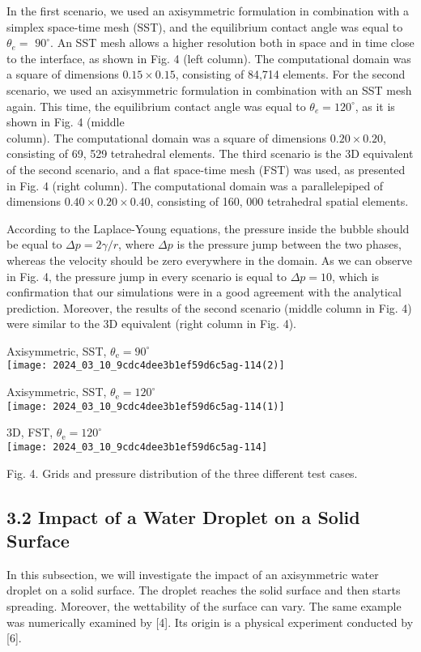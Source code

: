 \documentclass[10pt]{article}
\begin{document}
In the first scenario, we used an axisymmetric formulation in combination with a simplex space-time mesh (SST), and the equilibrium contact angle was equal to $\theta_{e}=$ $90^{\circ}$. An SST mesh allows a higher resolution both in space and in time close to the interface, as shown in Fig. 4 (left column). The computational domain was a square of dimensions $0.15 \times 0.15$, consisting of 84,714 elements. For the second scenario, we used an axisymmetric formulation in combination with an SST mesh again. This time, the equilibrium contact angle was equal to $\theta_{e}=120^{\circ}$, as it is shown in Fig. 4 (middle\\
column). The computational domain was a square of dimensions $0.20 \times 0.20$, consisting of 69, 529 tetrahedral elements. The third scenario is the 3D equivalent of the second scenario, and a flat space-time mesh (FST) was used, as presented in Fig. 4 (right column). The computational domain was a parallelepiped of dimensions $0.40 \times 0.20 \times 0.40$, consisting of 160, 000 tetrahedral spatial elements.

According to the Laplace-Young equations, the pressure inside the bubble should be equal to $\Delta p=2 \gamma / r$, where $\Delta p$ is the pressure jump between the two phases, whereas the velocity should be zero everywhere in the domain. As we can observe in Fig. 4, the pressure jump in every scenario is equal to $\Delta p=10$, which is confirmation that our simulations were in a good agreement with the analytical prediction. Moreover, the results of the second scenario (middle column in Fig. 4) were similar to the 3D equivalent (right column in Fig. 4).

Axisymmetric, SST, $\theta_{\mathrm{e}}=90^{\circ}$\\
\texttt{[image: 2024\_03\_10\_9cdc4dee3b1ef59d6c5ag-114(2)]}

Axisymmetric, SST, $\theta_{\mathrm{e}}=120^{\circ}$\\
\texttt{[image: 2024\_03\_10\_9cdc4dee3b1ef59d6c5ag-114(1)]}

3D, FST, $\theta_{\mathrm{e}}=120^{\circ}$\\
\texttt{[image: 2024\_03\_10\_9cdc4dee3b1ef59d6c5ag-114]}

Fig. 4. Grids and pressure distribution of the three different test cases.

\subsection*{3.2 Impact of a Water Droplet on a Solid Surface}
In this subsection, we will investigate the impact of an axisymmetric water droplet on a solid surface. The droplet reaches the solid surface and then starts spreading. Moreover, the wettability of the surface can vary. The same example was numerically examined by [4]. Its origin is a physical experiment conducted by [6].
\end{document}
